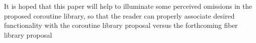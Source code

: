 It is hoped that this paper will help to illuminate some perceived omissions
in the proposed coroutine library, so that the reader can properly associate
desired functionality with the coroutine library proposal versus the
forthcoming fiber library proposal
